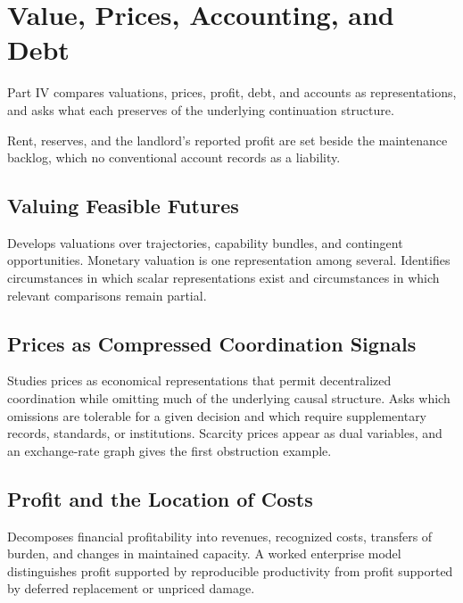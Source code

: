 \part{Value, Prices, Accounting, and Debt}
\label{part:IV}

Part IV compares valuations, prices, profit, debt, and accounts as representations, and asks what each preserves of the underlying continuation structure.

\begin{housing}Rent, reserves, and the landlord's reported profit are set beside the maintenance backlog, which no conventional account records as a liability.\end{housing}

\chapter{Valuing Feasible Futures}\label{ch:16}
Develops valuations over trajectories, capability bundles, and contingent opportunities. Monetary valuation is one representation among several. Identifies circumstances in which scalar representations exist and circumstances in which relevant comparisons remain partial.
\scaffold

\chapter{Prices as Compressed Coordination Signals}\label{ch:17}
Studies prices as economical representations that permit decentralized coordination while omitting much of the underlying causal structure. Asks which omissions are tolerable for a given decision and which require supplementary records, standards, or institutions. Scarcity prices appear as dual variables, and an exchange-rate graph gives the first obstruction example.
\scaffold

\chapter{Profit and the Location of Costs}\label{ch:18}
Decomposes financial profitability into revenues, recognized costs, transfers of burden, and changes in maintained capacity. A worked enterprise model distinguishes profit supported by reproducible productivity from profit supported by deferred replacement or unpriced damage.
\scaffold

